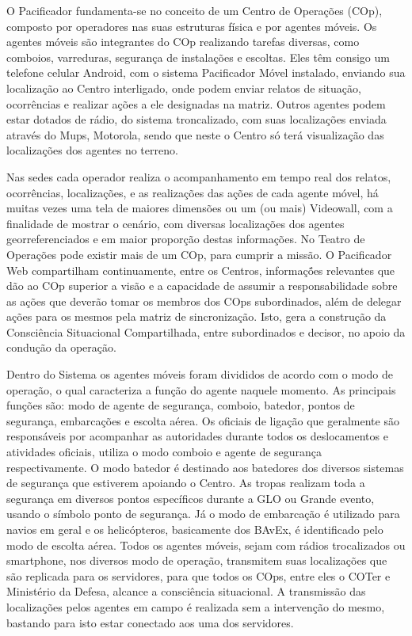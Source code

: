 O Pacificador fundamenta-se no conceito de um Centro de Operações (COp), composto por operadores nas suas estruturas física e por agentes móveis. Os agentes móveis são integrantes do COp realizando tarefas diversas, como comboios, varreduras, segurança de instalações e escoltas. Eles têm consigo um telefone celular Android, com o sistema Pacificador Móvel instalado,  enviando sua localização ao Centro interligado, onde podem enviar relatos de situação, ocorrências e realizar ações a ele designadas na matriz. Outros agentes podem estar dotados de rádio, do sistema troncalizado, com suas localizações enviada através do Mups, Motorola, sendo que neste o Centro só terá visualização das localizações dos agentes no terreno.

Nas sedes cada operador realiza o acompanhamento em tempo real dos relatos, ocorrências, localizações, e as realizações das ações de cada agente móvel, há muitas vezes uma tela de maiores dimensões ou um (ou mais) Videowall, com a finalidade de mostrar o cenário, com diversas localizações dos agentes georreferenciados e em maior proporção destas informações. No Teatro de Operações pode existir mais de um COp, para cumprir a missão. O Pacificador Web compartilham continuamente, entre os Centros, informaçṍes relevantes que dão ao COp superior a visão e a capacidade de assumir a responsabilidade sobre as ações que deverão tomar os membros dos COps subordinados, além de delegar ações para os mesmos pela matriz de sincronização. Isto, gera a construção da Consciência Situacional Compartilhada, entre subordinados e decisor, no apoio da condução da operação.

Dentro do Sistema os agentes móveis foram divididos de acordo com o modo de operação, o qual caracteriza a função do agente naquele momento. As principais funções são: modo de agente de segurança, comboio, batedor, pontos de segurança, embarcações e escolta aérea. Os oficiais de ligação que geralmente são responsáveis por acompanhar as autoridades durante todos os deslocamentos e atividades oficiais, utiliza o modo comboio e agente de segurança respectivamente. O modo batedor é destinado aos batedores dos diversos sistemas de segurança que estiverem apoiando o Centro. As tropas realizam toda a segurança em diversos pontos específicos durante a GLO ou Grande evento, usando o símbolo ponto de segurança. Já o modo de embarcação é utilizado para navios em geral e os helicópteros, basicamente dos BAvEx, é identificado pelo modo de escolta aérea. Todos os agentes móveis, sejam com rádios trocalizados ou smartphone, nos diversos modo de operação, transmitem suas localizações que são replicada para os servidores, para que todos os COps, entre eles o COTer e Ministério da Defesa, alcance a consciência situacional. A transmissão das localizações pelos agentes em campo é realizada sem a intervenção do mesmo, bastando para isto estar conectado aos uma dos servidores.

